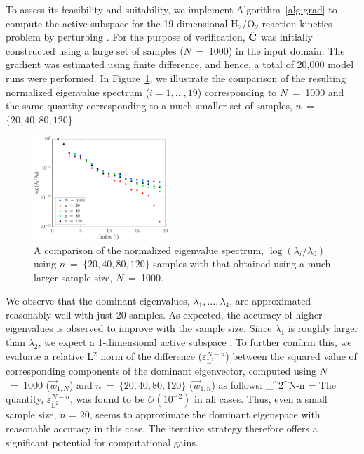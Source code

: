 To assess its feasibility and suitability, we implement
Algorithm~\ref{alg:grad} to compute the active subspace for 
the 19-dimensional H$_2$/O$_2$ reaction kinetics
problem by perturbing . For the purpose of verification,
$\hat{\mathbf{{C}}}$ was initially constructed using a large set of samples
($N$~=~1000) in the input domain. The gradient was estimated using
finite difference, and hence, a total of 20,000 model runs were performed. 
In Figure~\ref{fig:eig_comp}, we illustrate the comparison of
the resulting normalized eigenvalue spectrum  ($i = 1,\ldots,19$) corresponding to $N$~=~1000 and the same quantity corresponding to
a much smaller set of samples, $n$~=~$\{20,40,80,120\}$.
%
\begin{figure}[htbp]
 \begin{center}
  \includegraphics[width=0.45\textwidth]{./Figures/eig_comp_p3}
\caption{A comparison of the normalized eigenvalue spectrum, $\log(\lambda_i/\lambda_0)$
using $n$~=~$\{20,40,80,120\}$ samples with that
obtained using a much larger sample size, $N$~=~1000. 
} 
\label{fig:eig_comp}
\end{center}
\end{figure}
%
We observe that the dominant eigenvalues, $\lambda_1, \ldots, \lambda_4$, 
are approximated 
reasonably well with just 20 samples. As expected, the accuracy of higher-
 eigenvalues is observed
to improve with the sample size. Since 
$\lambda_1$ is roughly  larger than $\lambda_2$, we expect 
a 1-dimensional active subspace . 
To further confirm this, we evaluate a relative L$^2$ norm of the difference
 ($\varepsilon_{\text{L}^{2}}^{N-n}$) between the 
squared value of corresponding components of the dominant eigenvector, computed using $N$~=~1000 ($\vec{w}_{1,N}$)
and $n$~=~$\{20,40,80,120\}$ ($\vec{w}_{1,n}$) as follows:
%
\be
\varepsilon_{^{2}}^{N-n} = 
\label{eq:accu}
\ee
%
The quantity, $\varepsilon_{\text{L}^{2}}^{N-n}$, was found to be 
$\mathcal{O}(10^{-2})$ in all cases.
Thus, even a small sample size, $n$ = 20, seems to approximate the dominant eigenspace with
reasonable accuracy in this case. 
The iterative strategy therefore offers a significant potential for computational gains. 


